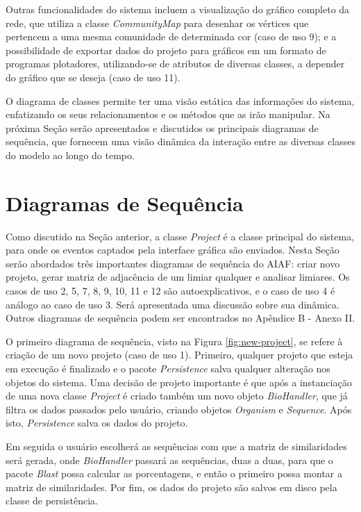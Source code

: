 Outras funcionalidades do sistema incluem a visualização do gráfico completo da rede, que utiliza a classe \textit{CommunityMap} para desenhar
os vértices que pertencem a uma mesma comunidade de determinada cor (caso de uso 9); e a possibilidade de exportar dados do projeto para
gráficos em um formato de programas plotadores, utilizando-se de atributos de diversas classes, a depender do gráfico que se deseja (caso de uso 11).

O diagrama de classes permite ter uma visão estática das informações do sistema, enfatizando os seus relacionamentos e os métodos que as irão manipular.
Na próxima Seção serão apresentados e discutidos os principais diagramas de sequência, que fornecem uma visão dinâmica da interação entre as diversas
classes do modelo ao longo do tempo.

\section{Diagramas de Sequência} \label{sec:dinamica}

Como discutido na Seção anterior, a classe \textit{Project} é a classe principal do sistema, para onde os eventos captados pela interface gráfica são
enviados. Nesta Seção serão abordados três importantes diagramas de sequência do AIAF: criar novo projeto, gerar matriz de adjacência de um limiar qualquer
e analisar limiares. Os casos de uso 2, 5, 7, 8, 9, 10, 11 e 12 são autoexplicativos, e o caso de uso 4 é análogo ao caso de uso 3. Será
apresentada uma discussão sobre sua dinâmica. Outros diagramas de sequência podem ser encontrados no Apêndice B - Anexo II.

O primeiro diagrama de sequência, visto na Figura \ref{fig:new-project}, se refere à criação de um novo projeto (caso de uso 1). Primeiro, qualquer projeto
que esteja em execução é finalizado e o pacote \textit{Persistence} salva qualquer alteração nos objetos do sistema. Uma decisão de projeto importante
é que após a instanciação de uma nova classe \textit{Project} é criado também um novo objeto \textit{BioHandler}, que já filtra os dados passados pelo
usuário, criando objetos \textit{Organism} e \textit{Sequence}. Após isto, \textit{Persistence} salva os dados do projeto.

Em seguida o usuário escolherá as sequências com que a matriz de similaridades será gerada, onde \textit{BioHandler} passará as sequências, duas a duas,
para que o pacote \textit{Blast} possa calcular as porcentagens, e então o primeiro possa montar a matriz de similaridades. Por fim, os dados do projeto
são salvos em disco pela classe de persistência.


